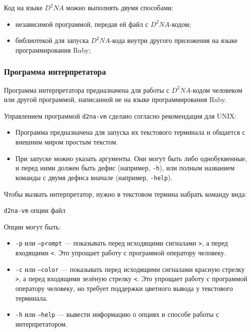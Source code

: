 \documentclass[utf8,a5paper,portrait,10pt,twoside]{eskdtext}
\begin{document}
Код на языке $D^2NA$ можно выполнять двумя способами:
\begin{itemize}
  \item независимой программой, передав ей файл с $D^2NA$-кодом;
  \item библиотекой для запуска $D^2NA$-кода внутри другого приложения на языке
        программирования Ruby;
\end{itemize}

\subsubsection{Программа интерпретатора}

Программа интерпретатора предназначена для работы с $D^2NA$-кодом человеком или
другой программой, написанной не на языке программирования Ruby.

Управлением программой \texttt{d2na-vm} сделано согласно рекомендация для
UNIX:
\begin{itemize}
  \item Программа предназначена для запуска их текстового терминала и общается
        с внешним миром простым текстом.
  \item При запуске можно указать аргументы. Они могут быть либо однобуквенные,
        и перед ними должен быть дефис (например, \texttt{-h}), или полным
        названием команды с двумя дефиса вначале (например, \texttt{-help}).
\end{itemize}

\newpage
Чтобы вызвать интерпретатор, нужно в текстовом термина набрать команду вида:

\texttt{d2na-vm} опции файл

Опции могут быть:

\begin{itemize}
  \item \texttt{-p} или \texttt{--prompt} — показывать перед исходящими
        сигналами \texttt{>}, а перед входящими \texttt{<}. Это упрощает работу
        с программой оператору человеку.
  \item \texttt{-c} или \texttt{--color} — показывать перед исходящими
        сигналами красную стрелку \texttt{>}, а перед входящими зелёную стрелку
        \texttt{<}. Это упрощает работу с программой оператору человеку, но
        требует поддержки цветного вывода у текстового терминала.
  \item \texttt{-h} или \texttt{--help} — вывести информацию о опциях и способе
        работы с интерпретатором.
\end{itemize}
\end{document}
